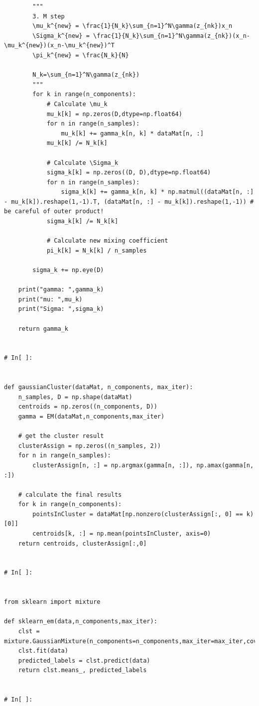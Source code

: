 ﻿\documentclass[a4paper, 11pt]{article}
\numberwithin{equation}{subsection}
\begin{document}
\begin{lstlisting}
        """
        3. M step
        \mu_k^{new} = \frac{1}{N_k}\sum_{n=1}^N\gamma(z_{nk})x_n
	    \Sigma_k^{new} = \frac{1}{N_k}\sum_{n=1}^N\gamma(z_{nk})(x_n-\mu_k^{new})(x_n-\mu_k^{new})^T
	    \pi_k^{new} = \frac{N_k}{N}

        N_k=\sum_{n=1}^N\gamma(z_{nk})
        """
        for k in range(n_components):
            # Calculate \mu_k
            mu_k[k] = np.zeros(D,dtype=np.float64)
            for n in range(n_samples):
                mu_k[k] += gamma_k[n, k] * dataMat[n, :]
            mu_k[k] /= N_k[k]

            # Calculate \Sigma_k
            sigma_k[k] = np.zeros((D, D),dtype=np.float64)
            for n in range(n_samples):
                sigma_k[k] += gamma_k[n, k] * np.matmul((dataMat[n, :] - mu_k[k]).reshape(1,-1).T, (dataMat[n, :] - mu_k[k]).reshape(1,-1)) # be careful of outer product!
            sigma_k[k] /= N_k[k]

            # Calculate new mixing coefficient
            pi_k[k] = N_k[k] / n_samples

        sigma_k += np.eye(D)

    print("gamma: ",gamma_k)
    print("mu: ",mu_k)
    print("Sigma: ",sigma_k)

    return gamma_k


# In[ ]:


def gaussianCluster(dataMat, n_components, max_iter):
    n_samples, D = np.shape(dataMat)
    centroids = np.zeros((n_components, D))
    gamma = EM(dataMat,n_components,max_iter)

    # get the cluster result
    clusterAssign = np.zeros((n_samples, 2))
    for n in range(n_samples):
        clusterAssign[n, :] = np.argmax(gamma[n, :]), np.amax(gamma[n, :])

    # calculate the final results
    for k in range(n_components):
        pointsInCluster = dataMat[np.nonzero(clusterAssign[:, 0] == k)[0]]
        centroids[k, :] = np.mean(pointsInCluster, axis=0)
    return centroids, clusterAssign[:,0]


# In[ ]:


from sklearn import mixture

def sklearn_em(data,n_components,max_iter):
    clst = mixture.GaussianMixture(n_components=n_components,max_iter=max_iter,covariance_type="full")
    clst.fit(data)
    predicted_labels = clst.predict(data)
    return clst.means_, predicted_labels


# In[ ]:



\end{lstlisting}
\end{document}
